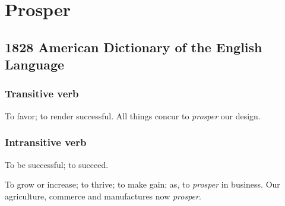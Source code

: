 \section{Prosper}
	\label{PROSPER}
	

\subsection{1828 American Dictionary of the English Language} %
	\label{PROSPER-1828}
	
	\subsubsection{Transitive verb}

		\begin{compactitem}
			\item To favor; to render successful. All things concur to \textit{prosper} our design.
		\end{compactitem}
		
	\subsubsection{Intransitive verb}

		\begin{compactitem}
			\item To be successful; to succeed.
			\item[1] To grow or increase; to thrive; to make gain; as, to \textit{prosper} in business. Our agriculture, commerce and manufactures now \textit{prosper}.
		\end{compactitem}



